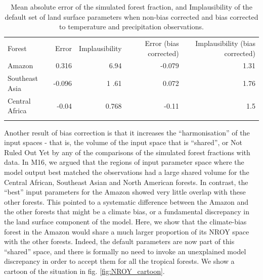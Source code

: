 \documentclass[gmd, manuscript]{copernicus}
\begin{document}
\begin{table}[t]
\caption{Mean absolute error of the simulated forest fraction, and Implausibility of the default set of land surface parameters when non-bias corrected and bias corrected to temperature and precipitation observations.}
\begin{tabular}{lrrrr}
\tophline

Forest                & Error &    Implausibility &  Error (bias corrected) &   Implausibility (bias corrected) \\
\middlehline
Amazon                &       0.316 &         6.94    &    -0.079  &    1.31  \\
Southeast Asia      &      -0.096   &   1       .61 &  0.072      &   1.76\\
Central Africa          & -0.04  &         0.768        & -0.11    & 1.5       \\
\bottomhline
\end{tabular}
\belowtable{} %
\label{tab:default_implausibility}
\end{table}


Another result of bias correction is that it increases the ``harmonisation'' of the input spaces - that is, the volume of the input space that is ``shared'', or Not Ruled Out Yet by any of the comparisons of the simulated forest fractions with data. In M16, we argued that the regions of input parameter space where the model output best matched the observations had a large shared volume for the Central African, Southeast Asian and North American forests. In contrast, the ``best'' input parameters for the Amazon showed very little overlap with these other forests. This pointed to a systematic difference between the Amazon and the other forests that might be a climate bias, or a fundamental discrepancy in the land surface component of the model. Here, we show that the climate-bias forest in the Amazon would share a much larger proportion of its NROY space with the other forests. Indeed, the default parameters are now part of this ``shared'' space, and there is formally no need to invoke an unexplained model discrepancy in order to accept them for all the tropical forests. We show a cartoon of the situation in fig. \ref{fig:NROY_cartoon}.
\end{document}

